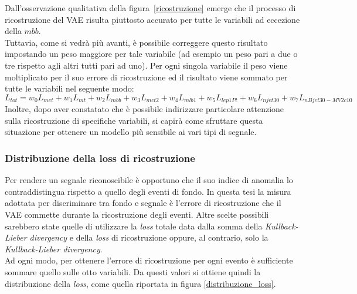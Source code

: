 Dall'osservazione qualitativa della figura~\ref{ricostruzione} emerge che il processo di ricostruzione del VAE risulta piuttosto accurato per tutte le variabili ad eccezione della $\textit{mbb}$. \\
Tuttavia, come si vedrà più avanti, è possibile correggere questo risultato impostando un peso maggiore per tale variabile (ad esempio un peso pari a due o tre rispetto agli altri tutti pari ad uno). Per ogni singola variabile il peso viene moltiplicato per il suo errore di ricostruzione ed il risultato viene sommato per tutte le variabili nel seguente modo:
\begin{equation}
	L_{tot} = w_0 L_{met} + w_1 L_{mt} + w_2 L_{mbb} + w_3 L_{mct2} + w_4 L_{mlb1} + w_5 L_{lep1Pt} + w_6 L_{njet30} + w_7 L_{nBjet30-MV2c10}
\end{equation} 
Inoltre, dopo aver constatato che è possibile indirizzare particolare attenzione sulla ricostruzione di specifiche variabili, si capirà come sfruttare questa situazione per ottenere un modello più sensibile ai vari tipi di segnale.\\

\newpage



\subsubsection{Distribuzione della loss di ricostruzione}
\label{reco_loss}

Per rendere un segnale riconoscibile è opportuno che il suo indice di anomalia lo contraddistingua rispetto a quello degli eventi di fondo. In questa tesi la misura adottata per discriminare tra fondo e segnale è l'errore di ricostruzione che il VAE commette durante la ricostruzione degli eventi. Altre scelte possibili sarebbero state quelle di utilizzare la \textit{loss} totale data dalla somma della \textit{Kullback-Lieber divergency} e della \textit{loss} di ricostruzione oppure, al contrario, solo la \textit{Kullback-Lieber divergency}. \\ 
Ad ogni modo, per ottenere l'errore di ricostruzione per ogni evento è sufficiente sommare quello sulle otto variabili. Da questi valori si ottiene quindi la distribuzione della \textit{loss}, come quella riportata in figura \ref{distribuzione_loss}. 

